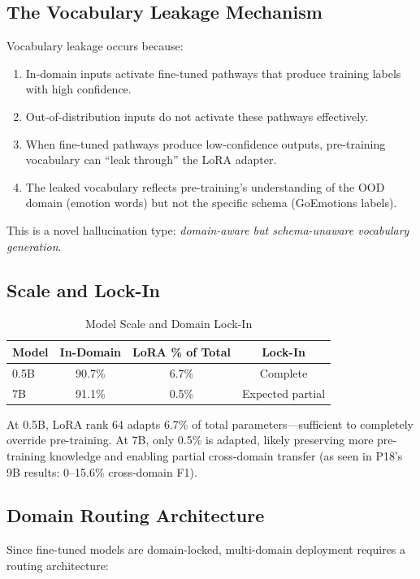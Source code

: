 \documentclass[journal]{IEEEtran}
\begin{document}
\subsection{The Vocabulary Leakage Mechanism}
Vocabulary leakage occurs because:
\begin{enumerate}
\item In-domain inputs activate fine-tuned pathways that produce training labels with high confidence.
\item Out-of-distribution inputs do not activate these pathways effectively.
\item When fine-tuned pathways produce low-confidence outputs, pre-training vocabulary can ``leak through'' the LoRA adapter.
\item The leaked vocabulary reflects pre-training's understanding of the OOD domain (emotion words) but not the specific schema (GoEmotions labels).
\end{enumerate}

This is a novel hallucination type: \emph{domain-aware but schema-unaware vocabulary generation}.

\subsection{Scale and Lock-In}

\begin{table}[!ht]
\centering
\caption{Model Scale and Domain Lock-In}
\label{tab:scale}
\begin{tabular}{lccc}
\toprule
\textbf{Model} & \textbf{In-Domain} & \textbf{LoRA \% of Total} & \textbf{Lock-In} \\
\midrule
0.5B & 90.7\% & 6.7\% & Complete \\
7B & 91.1\% & 0.5\% & Expected partial \\
\bottomrule
\end{tabular}
\end{table}

At 0.5B, LoRA rank 64 adapts 6.7\% of total parameters---sufficient to completely override pre-training. At 7B, only 0.5\% is adapted, likely preserving more pre-training knowledge and enabling partial cross-domain transfer (as seen in P18's 9B results: 0--15.6\% cross-domain F1).

\subsection{Domain Routing Architecture}
Since fine-tuned models are domain-locked, multi-domain deployment requires a routing architecture:
\end{document}
